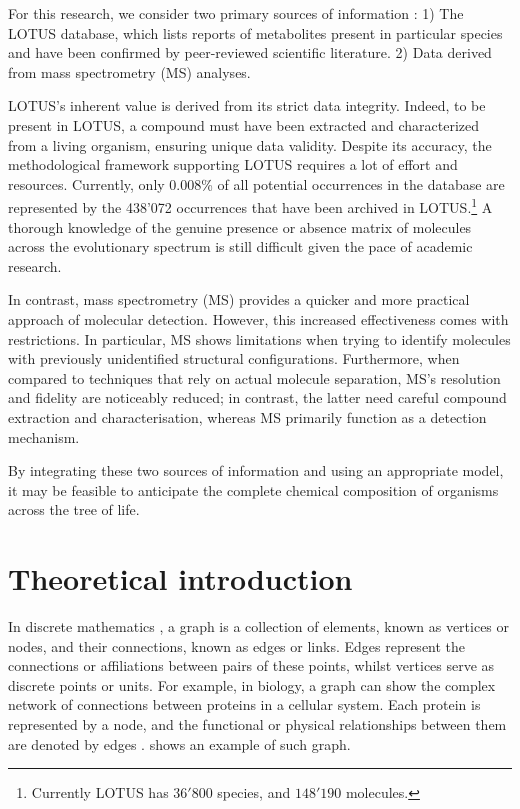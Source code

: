 \documentclass[
11pt, %
oneside, %
english, %
singlespacing, %
headsepline, %
chapterinoneline, %
]{MastersDoctoralThesis} %
\begin{document}
For this research, we consider two primary sources of information : 1) The LOTUS database, which lists reports of metabolites present in particular species and have been confirmed by peer-reviewed scientific literature. 2) Data derived from mass spectrometry (MS) analyses.

LOTUS's inherent value is derived from its strict data integrity. Indeed, to be present in LOTUS, a compound must have been extracted and characterized from a living organism, ensuring unique data validity. Despite its accuracy, the methodological framework supporting LOTUS requires a lot of effort and resources. Currently, only 0.008\% of all potential occurrences in the database are represented by the 438'072 occurrences that have been archived in LOTUS.\footnote{Currently LOTUS has $36'800$ species, and $148'190$ molecules.} A thorough knowledge of the genuine presence or absence matrix of molecules across the evolutionary spectrum is still difficult given the pace of academic research.

In contrast, mass spectrometry (MS) provides a quicker and more practical approach of molecular detection. However, this increased effectiveness comes with restrictions. In particular, MS shows limitations when trying to identify molecules with previously unidentified structural configurations. Furthermore, when compared to techniques that rely on actual molecule separation, MS's resolution and fidelity are noticeably reduced; in contrast, the latter need careful compound extraction and characterisation, whereas MS primarily function as a detection mechanism.

By integrating these two sources of information and using an appropriate model, it may be feasible to anticipate the complete chemical composition of organisms across the tree of life. 




\chapter{Theoretical introduction}\label{chap:Theoretical introduction}
In discrete mathematics \cite{johnsonbaughDiscreteMathematics2018}, a graph is a collection of elements, known as vertices or nodes, and their connections, known as edges or links. Edges represent the connections or affiliations between pairs of these points, whilst vertices serve as discrete points or units. For example, in biology, a graph can show the complex network of connections between proteins in a cellular system. Each protein is represented by a node, and the functional or physical relationships between them are denoted by edges \cite{trudeauIntroductionGraphTheory1993}.  shows an example of such graph.
\end{document}
